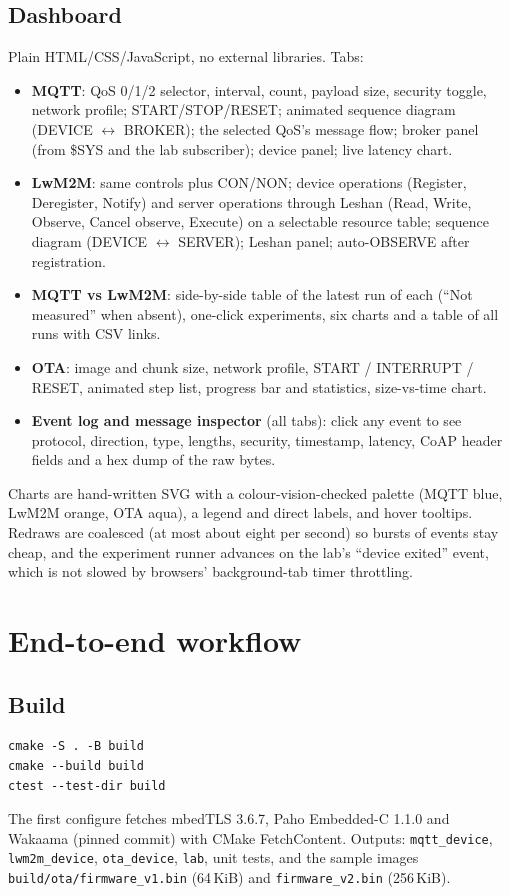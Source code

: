 \documentclass[11pt,a4paper]{article}
\newcommand{\code}[1]{\texttt{#1}}
\begin{document}
\subsection{Dashboard}
Plain HTML/CSS/JavaScript, no external libraries. Tabs:
\begin{itemize}
  \item \textbf{MQTT}: QoS 0/1/2 selector, interval, count, payload size,
        security toggle, network profile; START/STOP/RESET; animated sequence
        diagram (DEVICE $\leftrightarrow$ BROKER); the selected QoS's message
        flow; broker panel (from \$SYS and the lab subscriber); device panel;
        live latency chart.
  \item \textbf{LwM2M}: same controls plus CON/NON; device operations
        (Register, Deregister, Notify) and server operations through Leshan
        (Read, Write, Observe, Cancel observe, Execute) on a selectable
        resource table; sequence diagram (DEVICE $\leftrightarrow$ SERVER);
        Leshan panel; auto-OBSERVE after registration.
  \item \textbf{MQTT vs LwM2M}: side-by-side table of the latest run of each
        (``Not measured'' when absent), one-click experiments, six charts and a
        table of all runs with CSV links.
  \item \textbf{OTA}: image and chunk size, network profile, START / INTERRUPT /
        RESET, animated step list, progress bar and statistics, size-vs-time chart.
  \item \textbf{Event log and message inspector} (all tabs): click any event to
        see protocol, direction, type, lengths, security, timestamp, latency,
        CoAP header fields and a hex dump of the raw bytes.
\end{itemize}
Charts are hand-written SVG with a colour-vision-checked palette (MQTT blue,
LwM2M orange, OTA aqua), a legend and direct labels, and hover tooltips.
Redraws are coalesced (at most about eight per second) so bursts of events stay
cheap, and the experiment runner advances on the lab's ``device exited''
event, which is not slowed by browsers' background-tab timer throttling.

\section{End-to-end workflow}

\subsection{Build}
\begin{lstlisting}
cmake -S . -B build
cmake --build build
ctest --test-dir build
\end{lstlisting}
The first configure fetches mbedTLS 3.6.7, Paho Embedded-C 1.1.0 and Wakaama
(pinned commit) with CMake FetchContent. Outputs: \code{mqtt\_device},
\code{lwm2m\_device}, \code{ota\_device}, \code{lab}, unit tests, and the sample
images \code{build/ota/firmware\_v1.bin} (64\,KiB) and \code{firmware\_v2.bin}
(256\,KiB).
\end{document}
